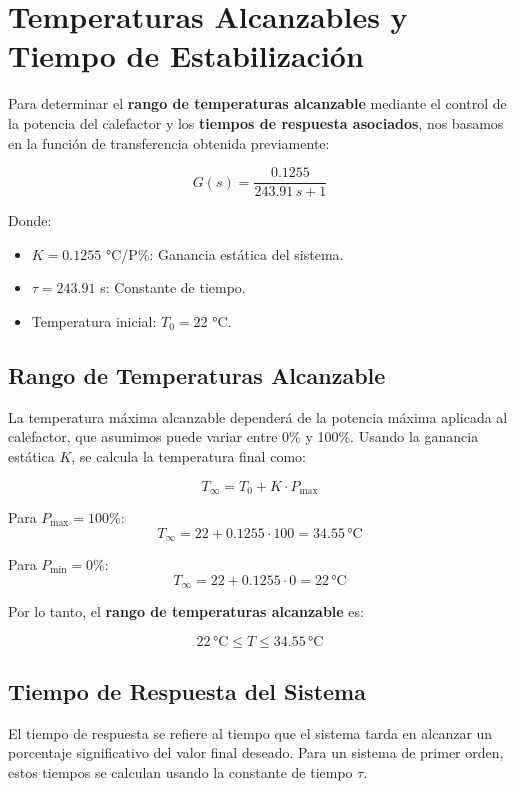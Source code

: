 \documentclass[spanish, a4paper, 11pt]{article}
\begin{document}
\section{Temperaturas Alcanzables y Tiempo de Estabilización}

Para determinar el \textbf{rango de temperaturas alcanzable} mediante el control de la potencia del calefactor y los \textbf{tiempos de respuesta asociados}, nos basamos en la función de transferencia obtenida previamente:

\[
G(s) = \frac{0.1255}{243.91 \, s + 1}
\]

Donde:
\begin{itemize}
    \item $K = 0.1255$ °C/P\%: Ganancia estática del sistema.
    \item $\tau = 243.91$ s: Constante de tiempo.
    \item Temperatura inicial: $T_0 = 22$ °C.
\end{itemize}

\subsection{Rango de Temperaturas Alcanzable}

La temperatura máxima alcanzable dependerá de la potencia máxima aplicada al calefactor, que asumimos puede variar entre 0\% y 100\%. Usando la ganancia estática $K$, se calcula la temperatura final como:

\[
T_{\infty} = T_0 + K \cdot P_{\text{max}}
\]

Para $P_{\text{max}} = 100\%$:
\[
T_{\infty} = 22 + 0.1255 \cdot 100 = 34.55 \, \text{°C}
\]

Para $P_{\text{min}} = 0\%$:
\[
T_{\infty} = 22 + 0.1255 \cdot 0 = 22 \, \text{°C}
\]

Por lo tanto, el \textbf{rango de temperaturas alcanzable} es:

\[
22 \, \text{°C} \leq T \leq 34.55 \, \text{°C}
\]

\subsection{Tiempo de Respuesta del Sistema}

El tiempo de respuesta se refiere al tiempo que el sistema tarda en alcanzar un porcentaje significativo del valor final deseado. Para un sistema de primer orden, estos tiempos se calculan usando la constante de tiempo $\tau$.
\end{document}
